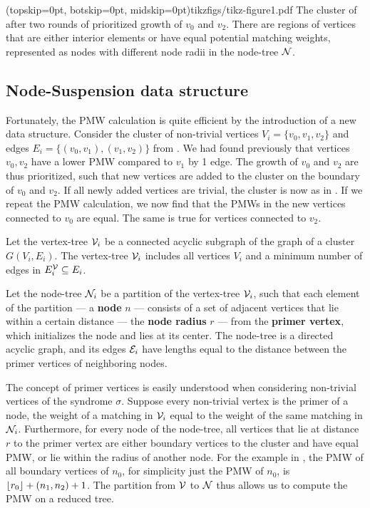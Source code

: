 \Figure[htb](topskip=0pt, botskip=0pt, midskip=0pt){tikzfigs/tikz-figure1.pdf}{
    The cluster of  after two rounds of prioritized growth of $v_0$ and $v_2$. There are regions of vertices that are either interior elements or have equal potential matching weights, represented as nodes with different node radii in the node-tree $\mathcal{N}$. \label{fig1}}

\subsection{Node-Suspension data structure}\label{sec:nodeset}

Fortunately, the PMW calculation is quite efficient by the introduction of a new data structure. Consider the cluster of non-trivial vertices $V_i=\{v_0,v_1,v_2\}$ and edges $E_i = \{(v_0,v_1), (v_1, v_2)\}$ from . We had found previously that vertices $v_0, v_2$ have a lower PMW compared to $v_1$ by 1 edge. The growth of $v_0$ and $v_2$ are thus prioritized, such that new vertices are added to the cluster on the boundary of $v_0$ and $v_2$. If all newly added vertices are trivial, the cluster is now as in . If we repeat the PMW calculation, we now find that the PMWs in the new vertices connected to $v_0$ are equal. The same is true for vertices connected to $v_2$. 
\begin{definition}\label{def:vertextree}
    Let the vertex-tree $\mathcal{V}_i$ be a connected acyclic subgraph of the graph of a cluster $G(V_i, E_i)$.   The vertex-tree $\mathcal{V}_i$ includes all vertices $V_i$ and a minimum number of edges in $E^{\mathcal{V}}_i \subseteq E_i$. 
\end{definition}
\begin{definition}
  Let the node-tree $\mathcal{N}_i$ be a partition of the vertex-tree $\mathcal{V}_i$, such that each element of the partition --- a \textbf{node} $n$ --- consists of a set of adjacent vertices that lie within a certain distance --- the \textbf{node radius} $r$ --- from the \textbf{primer vertex}, which initializes the node and lies at its center. The node-tree is a directed acyclic graph, and its edges $\mathcal{E}_i$ have lengths equal to the distance between the primer vertices of neighboring nodes. 
\end{definition}

The concept of primer vertices is easily understood when considering non-trivial vertices of the syndrome $\sigma$. Suppose every non-trivial vertex is the primer of a node, the weight of a matching in $\mathcal{V}_i$ equal to the weight of the same matching in $\mathcal{N}_i$. Furthermore, for every node of the node-tree, all vertices that lie at distance $r$ to the primer vertex are either boundary vertices to the cluster and have equal PMW, or lie within the radius of another node. For the example in , the PMW of all boundary vertices of $n_0$, for simplicity just the PMW of $n_0$, is ${\left \lfloor r_0 \right \rfloor } + (n_1, n_2) + 1$. The partition from $\mathcal{V}$ to $\mathcal{N}$ thus allows us to compute the PMW on a reduced tree. 

